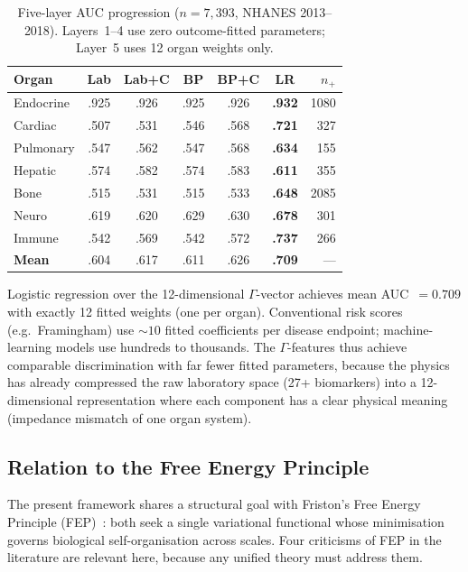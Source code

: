 \documentclass[aps,pre,twocolumn,superscriptaddress,floatfix]{revtex4-2}
\begin{document}
\begin{table}[h]
\centering
\caption{Five-layer AUC progression
  ($n = 7{,}393$, NHANES 2013--2018).
  Layers~1--4 use zero outcome-fitted parameters;
  Layer~5 uses 12 organ weights only.}
\label{tab:five-layer}
\footnotesize
\begin{tabular}{lcccccr}
\toprule
Organ & Lab & Lab+C & BP & BP+C
  & \textbf{LR} & $n_{+}$ \\
\midrule
Endocrine  & .925 & .926 & .925 & .926 & \textbf{.932} & 1080 \\
Cardiac    & .507 & .531 & .546 & .568 & \textbf{.721} &  327 \\
Pulmonary  & .547 & .562 & .547 & .568 & \textbf{.634} &  155 \\
Hepatic    & .574 & .582 & .574 & .583 & \textbf{.611} &  355 \\
Bone       & .515 & .531 & .515 & .533 & \textbf{.648} & 2085 \\
Neuro      & .619 & .620 & .629 & .630 & \textbf{.678} &  301 \\
Immune     & .542 & .569 & .542 & .572 & \textbf{.737} &  266 \\
\midrule
\textbf{Mean}
  & .604 & .617 & .611 & .626
  & \textbf{.709} & --- \\
\bottomrule
\end{tabular}
\end{table}

\begin{remark}
\label{rem:info-efficiency}
Logistic regression over the 12-dimensional
$\Gamma$-vector achieves mean AUC~$= 0.709$
with exactly 12 fitted weights (one per organ).
Conventional risk scores (e.g.\ Framingham)
use ${\sim}10$ fitted coefficients per disease
endpoint; machine-learning models use hundreds
to thousands.
The $\Gamma$-features thus achieve comparable
discrimination with far fewer fitted parameters,
because the physics has already compressed the
raw laboratory space (27+ biomarkers) into
a 12-dimensional representation where each
component has a clear physical meaning
(impedance mismatch of one organ system).
\end{remark}
\subsection{Relation to the Free Energy Principle}

The present framework shares a structural goal with
Friston's Free Energy Principle
(FEP)~\cite{Friston2010}: both seek a single
variational functional whose minimisation governs
biological self-organisation across scales.
Four criticisms of FEP in the literature are relevant
here, because any unified theory must address them.
\end{document}
